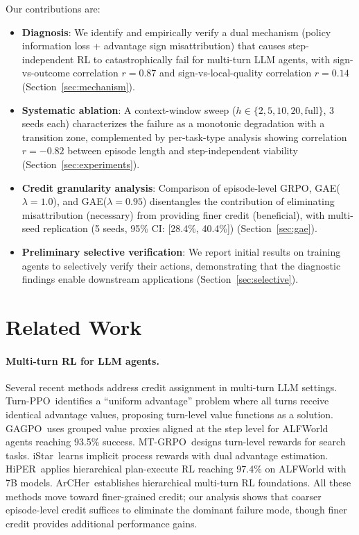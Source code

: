 \documentclass[11pt]{article}
\begin{document}
Our contributions are:
\begin{itemize}
    \item \textbf{Diagnosis}: We identify and empirically verify a dual mechanism (policy information loss + advantage sign misattribution) that causes step-independent RL to catastrophically fail for multi-turn LLM agents, with sign-vs-outcome correlation $r=0.87$ and sign-vs-local-quality correlation $r=0.14$ (Section~\ref{sec:mechanism}).
    \item \textbf{Systematic ablation}: A context-window sweep ($h \in \{2, 5, 10, 20, \text{full}\}$, 3 seeds each) characterizes the failure as a monotonic degradation with a transition zone, complemented by per-task-type analysis showing correlation $r=-0.82$ between episode length and step-independent viability (Section~\ref{sec:experiments}).
    \item \textbf{Credit granularity analysis}: Comparison of episode-level GRPO, GAE($\lambda=1.0$), and GAE($\lambda=0.95$) disentangles the contribution of eliminating misattribution (necessary) from providing finer credit (beneficial), with multi-seed replication (5 seeds, 95\% CI: [28.4\%, 40.4\%]) (Section~\ref{sec:gae}).
    \item \textbf{Preliminary selective verification}: We report initial results on training agents to selectively verify their actions, demonstrating that the diagnostic findings enable downstream applications (Section~\ref{sec:selective}).
\end{itemize}

\section{Related Work}

\paragraph{Multi-turn RL for LLM agents.}
Several recent methods address credit assignment in multi-turn LLM settings. Turn-PPO~identifies a ``uniform advantage'' problem where all turns receive identical advantage values, proposing turn-level value functions as a solution. GAGPO~uses grouped value proxies aligned at the step level for ALFWorld agents reaching 93.5\% success. MT-GRPO~designs turn-level rewards for search tasks. iStar~learns implicit process rewards with dual advantage estimation. HiPER~applies hierarchical plan-execute RL reaching 97.4\% on ALFWorld with 7B models. ArCHer~establishes hierarchical multi-turn RL foundations. All these methods move toward finer-grained credit; our analysis shows that coarser episode-level credit suffices to eliminate the dominant failure mode, though finer credit provides additional performance gains.
\end{document}

